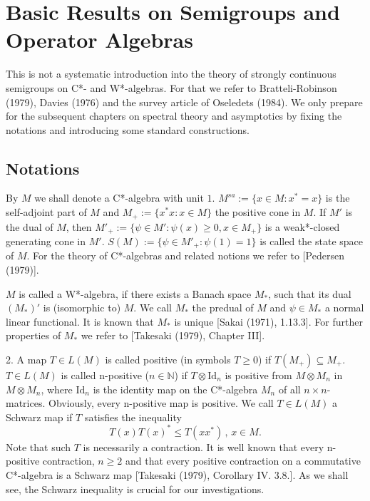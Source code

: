 
\chapter{Basic Results on Semigroups and Operator Algebras}\label{chap:D-I}

This is not a systematic introduction into the theory of strongly continuous semigroups on C*- and W*-algebras.
For that we refer to Bratteli-Robinson (1979), Davies (1976) and the survey article of Oseledets (1984).
We only prepare for the subsequent chapters on spectral theory and asymptotics by fixing the notations and introducing some standard constructions.

\section{Notations}\label{sec:notations}

By $ M $ we shall denote a C*-algebra with unit $ 1 $.
$ M^{sa} := \{x \in M : x^* = x\} $ is the self-adjoint part of $ M $ and $ M_{+} := \{ x^*x : x \in M\} $ the positive cone in $ M $.
If $ M' $ is the dual of $ M $, then $ M'_{+} := \{\psi \in M' : \psi(x) \geq 0, x \in M_{+}\} $ is a weak*-closed generating cone in $ M' $.
$ S(M) := \{\psi \in M'_{+}: \psi(1) = 1\} $ is called the state space of $ M $.
For the theory of C*-algebras and related notions we refer to [Pedersen (1979)].

$ M $ is called a W*-algebra, if there exists a Banach space $ M_{*} $, such that its dual $ (M_{*})' $ is (isomorphic to) $ M $.
We call $ M_{*} $ the predual of $ M $ and $ \psi \in M_{*} $ a normal linear functional.
It is known that $ M_{*} $ is unique [Sakai (1971), 1.13.3].
For further properties of $ M_{*} $ we refer to [Takesaki (1979), Chapter III].

2. A map $ T \in L(M) $ is called positive (in symbols $ T \geq 0 $) if $ T(M_{+}) \subseteq M_{+} $.
$ T \in L(M) $ is called n-positive ($ n \in \mathbb{N} $) if $ T \otimes \text{Id}_n $ is positive from $ M \otimes M_n $ in $ M \otimes M_n $, where $ \text{Id}_n $ is the identity map on the C*-algebra $ M_n $ of all $ n \times n $-matrices.
Obviously, every n-positive map is positive.
We call $ T \in L(M) $ a Schwarz map if $ T $ satisfies the inequality
\[
T(x)T(x)^* \leq T(xx^*) \, , \, x \in M .
\]
Note that such $ T $ is necessarily a contraction.
It is well known that every n-positive contraction, $ n \geq 2 $ and that every positive contraction on a commutative C*-algebra is a Schwarz map [Takesaki (1979), Corollary IV. 3.8.].
As we shall see, the Schwarz inequality is crucial for our investigations.

